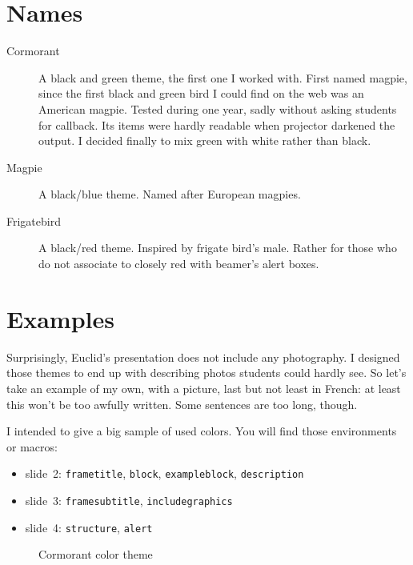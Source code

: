 \documentclass[12pt]{article}
\begin{document}
\section{Names}


\begin{description}
\item[Cormorant]
A black and green theme, the first one I worked with. First named magpie, since the first black and green bird I could find on the web was an American magpie. 
Tested during one year, sadly without asking students for callback. Its items were hardly readable when projector darkened the output. I decided finally to mix green with white rather than black. 

\item[Magpie]
A black/blue theme. Named after European magpies.

\item[Frigatebird]
A black/red theme. Inspired by frigate bird's male. Rather for those who do not associate to closely red with beamer's alert boxes. 
\end{description}

\section{Examples}

Surprisingly, Euclid's presentation does not include any photography. I designed those themes to end up with describing photos students could hardly see. So let's take an example of my own, with a picture, last but not least in French: at least this won't be too awfully written.
Some sentences are too long, though.

I intended to give a big sample of used colors. You will find those environments or macros: 
\begin{itemize}
   \item slide 2: \verb+frametitle+, \verb+block+, \verb+exampleblock+, \verb+description+
   \item slide 3: \verb+framesubtitle+, \verb+includegraphics+ 
   \item slide 4: \verb+structure+, \verb+alert+
\end{itemize}

\begin{figure}[p]

   \caption{Cormorant color theme}
\end{figure}
\end{document}
